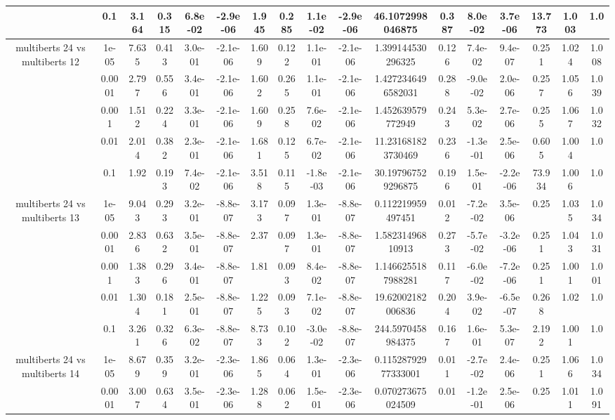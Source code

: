 \begin{tabular}{|c|c|c|c|c|c|c|c|c|c|c|c|c|c|c|c|c|}
 & 0.1 & 3.164 & 0.315 & 6.8e-02 & -2.9e-06 & 1.945 & 0.285 & 1.1e-02 & -2.9e-06 & 46.1072998046875 & 0.387 & 8.0e-02 & 3.7e-06 & 13.773 & 1.003 & 1.0 \\
\hline
\multirow{5}{*}{multiberts 24 vs multiberts 12} & 1e-05 & 7.635 & 0.413 & 3.0e-01 & -2.1e-06 & 1.609 & 0.122 & 1.1e-01 & -2.1e-06 & 1.399144530296325 & 0.126 & 7.4e-02 & 9.4e-07 & 0.251 & 1.024 & 1.008 \\
 & 0.0001 & 2.797 & 0.556 & 3.4e-01 & -2.1e-06 & 1.602 & 0.265 & 1.1e-01 & -2.1e-06 & 1.4272346496582031 & 0.288 & -9.0e-02 & 2.0e-06 & 0.257 & 1.056 & 1.039 \\
 & 0.001 & 1.512 & 0.224 & 3.3e-01 & -2.1e-06 & 1.609 & 0.258 & 7.6e-02 & -2.1e-06 & 1.452639579772949 & 0.243 & 5.3e-02 & 2.7e-06 & 0.255 & 1.067 & 1.032 \\
 & 0.01 & 2.014 & 0.382 & 2.3e-01 & -2.1e-06 & 1.681 & 0.125 & 6.7e-02 & -2.1e-06 & 11.231681823730469 & 0.236 & -1.3e-01 & 2.5e-06 & 0.605 & 1.004 & 1.0 \\
 & 0.1 & 1.92 & 0.193 & 7.4e-02 & -2.1e-06 & 3.518 & 0.115 & -1.8e-03 & -2.1e-06 & 30.197967529296875 & 0.196 & 1.5e-01 & -2.2e-06 & 73.934 & 1.006 & 1.0 \\
\hline
\multirow{5}{*}{multiberts 24 vs multiberts 13} & 1e-05 & 9.043 & 0.293 & 3.2e-01 & -8.8e-07 & 3.173 & 0.097 & 1.3e-01 & -8.8e-07 & 0.112219959497451 & 0.012 & -7.2e-02 & 3.5e-06 & 0.25 & 1.035 & 1.034 \\
 & 0.0001 & 2.836 & 0.632 & 3.5e-01 & -8.8e-07 & 2.37 & 0.097 & 1.3e-01 & -8.8e-07 & 1.58231496810913 & 0.273 & -5.7e-02 & -3.2e-06 & 0.251 & 1.043 & 1.031 \\
 & 0.001 & 1.383 & 0.296 & 3.4e-01 & -8.8e-07 & 1.81 & 0.093 & 8.4e-02 & -8.8e-07 & 1.1466255187988281 & 0.117 & -6.0e-02 & -7.2e-06 & 0.251 & 1.001 & 1.001 \\
 & 0.01 & 1.304 & 0.181 & 2.5e-01 & -8.8e-07 & 1.225 & 0.093 & 7.1e-02 & -8.8e-07 & 19.62002182006836 & 0.204 & 3.9e-02 & -6.5e-07 & 0.268 & 1.02 & 1.0 \\
 & 0.1 & 3.261 & 0.326 & 6.3e-02 & -8.8e-07 & 8.733 & 0.102 & -3.0e-02 & -8.8e-07 & 244.5970458984375 & 0.167 & 1.6e-01 & 5.3e-07 & 2.192 & 1.001 & 1.0 \\
\hline
\multirow{5}{*}{multiberts 24 vs multiberts 14} & 1e-05 & 8.679 & 0.359 & 3.2e-01 & -2.3e-06 & 1.865 & 0.064 & 1.3e-01 & -2.3e-06 & 0.11528792977333001 & 0.011 & -2.7e-02 & 2.4e-06 & 0.251 & 1.066 & 1.034 \\
 & 0.0001 & 3.007 & 0.634 & 3.5e-01 & -2.3e-06 & 1.288 & 0.062 & 1.5e-01 & -2.3e-06 & 0.070273675024509 & 0.01 & -1.2e-01 & 2.5e-06 & 0.25 & 1.011 & 1.091 \\

\end{tabular}
